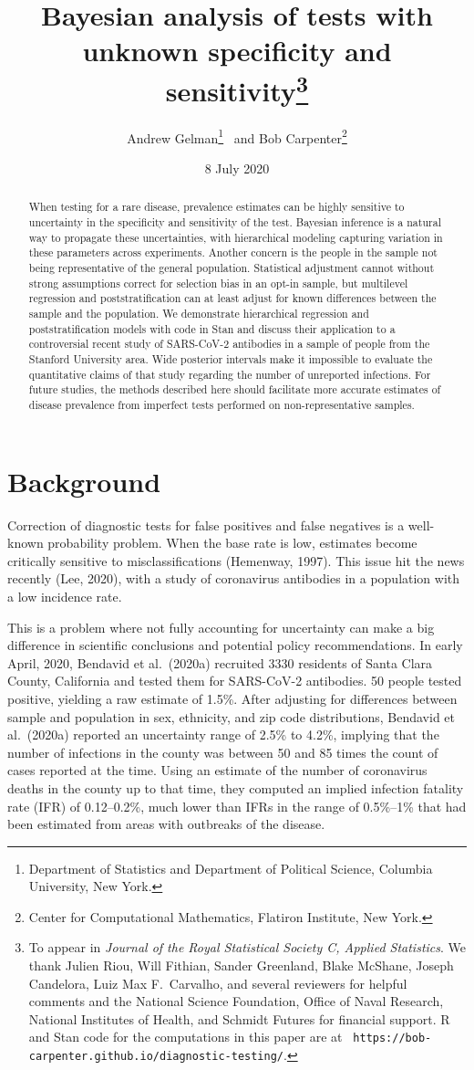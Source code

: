 \documentclass[11pt]{article}
\title{\bf Bayesian analysis of tests with unknown specificity and
  sensitivity\footnote{To appear in {\em Journal of the Royal Statistical Society C, Applied Statistics}.  We thank Julien Riou, Will Fithian, Sander
    Greenland, Blake McShane, Joseph Candelora, Luiz Max F.~Carvalho,
    and several reviewers for helpful comments and the National
    Science Foundation, Office of Naval Research, National Institutes
    of Health, and Schmidt Futures for financial support.  R and Stan
    code for the computations in this paper are at {\tt
      https://bob-carpenter.github.io/diagnostic-testing/}.}\vspace{.1in}}
\author{Andrew Gelman\footnote{Department of Statistics and Department
    of Political Science, Columbia University, New York.}  \ and Bob
  Carpenter\footnote{Center for Computational Mathematics, Flatiron
    Institute, New York.}  \vspace{.1in}}
\date{8 July 2020}
\begin{document}
\sloppy
\maketitle

\begin{abstract}
\noindent
When testing for a rare disease, prevalence estimates can be highly
sensitive to uncertainty in the specificity and sensitivity of the
test.  Bayesian inference is a natural way to propagate these
uncertainties, with hierarchical modeling capturing variation in these
parameters across experiments.  Another concern is the people in the
sample not being representative of the general population.
Statistical adjustment cannot without strong assumptions correct for
selection bias in an opt-in sample, but multilevel regression and
poststratification can at least adjust for known differences between
the sample and the population.  We demonstrate hierarchical regression
and poststratification models with code in Stan and discuss their
application to a controversial recent study of SARS-CoV-2 antibodies in
a sample of people from the Stanford University area.  Wide posterior
intervals make it impossible to evaluate the quantitative claims of
that study regarding the number of unreported infections.  For future
studies, the methods described here should facilitate more accurate
estimates of disease prevalence from imperfect tests performed on
non-representative samples.
\end{abstract}

\section{Background}

Correction of diagnostic tests for false positives and false negatives
is a well-known probability problem.  When the base rate is low,
estimates become critically sensitive to misclassifications (Hemenway,
1997).  This issue hit the news recently (Lee, 2020), with a
study of coronavirus antibodies in a population with a low incidence
rate.

This is a problem where not fully accounting for uncertainty can make
a big difference in scientific conclusions and potential policy
recommendations.  In early April, 2020, Bendavid et al.\ (2020a)
recruited 3330 residents of Santa Clara County, California and tested
them for SARS-CoV-2 antibodies.  50 people tested positive, yielding a
raw estimate of 1.5\%.  After adjusting for differences between sample
and population in sex, ethnicity, and zip code distributions, Bendavid
et al.\ (2020a) reported an uncertainty range of 2.5\% to 4.2\%,
implying that the number of infections in the county was between 50
and 85 times the count of cases reported at the time.  Using an
estimate of the number of coronavirus deaths in the county up to that
time, they computed an implied infection fatality rate (IFR) of
0.12--0.2\%, much lower than IFRs in the range of 0.5\%--1\% that had
been estimated from areas with outbreaks of the disease.
\end{document}
